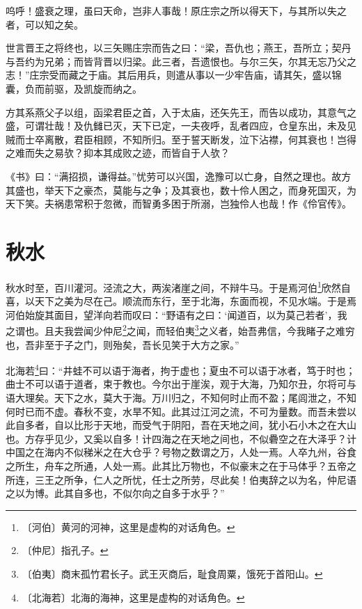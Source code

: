 \documentclass[12pt,UTF-8,openany]{ctexbook}
\begin{document}
\begin{normalsize}
    
    呜呼！盛衰之理，虽曰天命，岂非人事哉！原庄宗之所以得天下，与其所以失之者，可以知之矣。
    
    世言晋王之将终也，以三矢赐庄宗而告之曰：“梁，吾仇也；燕王，吾所立；契丹与吾约为兄弟；而皆背晋以归梁。此三者，吾遗恨也。与尔三矢，尔其无忘乃父之志！”庄宗受而藏之于庙。其后用兵，则遣从事以一少牢告庙，请其矢，盛以锦囊，负而前驱，及凯旋而纳之。
    
    方其系燕父子以组，函梁君臣之首，入于太庙，还矢先王，而告以成功，其意气之盛，可谓壮哉！及仇雠已灭，天下已定，一夫夜呼，乱者四应，仓皇东出，未及见贼而士卒离散，君臣相顾，不知所归。至于誓天断发，泣下沾襟，何其衰也！岂得之难而失之易欤？抑本其成败之迹，而皆自于人欤？
    
    《书》曰：“满招损，谦得益。”忧劳可以兴国，逸豫可以亡身，自然之理也。故方其盛也，举天下之豪杰，莫能与之争；及其衰也，数十伶人困之，而身死国灭，为天下笑。夫祸患常积于忽微，而智勇多困于所溺，岂独伶人也哉！作《伶官传》。
\end{normalsize}



\chapter{秋水}

\begin{normalsize}
    
    秋水时至，百川灌河。泾流之大，两涘渚崖之间，不辩牛马。于是焉河伯\footnote{〔河伯〕黄河的河神，这里是虚构的对话角色。}欣然自喜，以天下之美为尽在己。顺流而东行，至于北海，东面而视，不见水端。于是焉河伯始旋其面目，望洋向若而叹曰：“野语有之曰：‘闻道百，以为莫己若者’，我之谓也。且夫我尝闻少仲尼\footnote{〔仲尼〕指孔子。}之闻，而轻伯夷\footnote{〔伯夷〕商末孤竹君长子。武王灭商后，耻食周粟，饿死于首阳山。}之义者，始吾弗信，今我睹子之难穷也，吾非至于子之门，则殆矣，吾长见笑于大方之家。”
    
    北海若\footnote{〔北海若〕北海的海神，这里是虚构的对话角色。}曰：“井蛙不可以语于海者，拘于虚也；夏虫不可以语于冰者，笃于时也；曲士不可以语于道者，束于教也。今尔出于崖涘，观于大海，乃知尔丑，尔将可与语大理矣。天下之水，莫大于海。万川归之，不知何时止而不盈；尾闾泄之，不知何时已而不虚。春秋不变，水旱不知。此其过江河之流，不可为量数。而吾未尝以此自多者，自以比形于天地，而受气于阴阳，吾在天地之间，犹小石小木之在大山也。方存乎见少，又奚以自多！计四海之在天地之间也，不似礨空之在大泽乎？计中国之在海内不似稊米之在大仓乎？号物之数谓之万，人处一焉。人卒九州，谷食之所生，舟车之所通，人处一焉。此其比万物也，不似豪末之在于马体乎？五帝之所连，三王之所争，仁人之所忧，任士之所劳，尽此矣！伯夷辞之以为名，仲尼语之以为博。此其自多也，不似尔向之自多于水乎？”
\end{normalsize}
\end{document}
